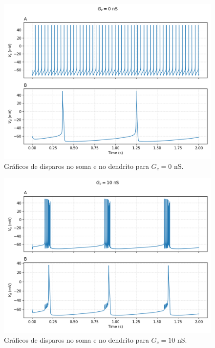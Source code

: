 \documentclass[english,11pt,a4paper]{article}
\begin{document}
	\begin{figure}[H]
		\centering
		\includegraphics[width=12cm]{../figures/ex_3_gc0.png}
		\caption{Gráficos de disparos no soma e no dendrito para $G_c = 0$ nS.}
	\end{figure}
	
	\begin{figure}[H]
		\centering
		\includegraphics[width=12cm]{../figures/ex_3_gc10.png}
		\caption{Gráficos de disparos no soma e no dendrito para $G_c = 10$ nS.}
	\end{figure}
	
\end{document}
